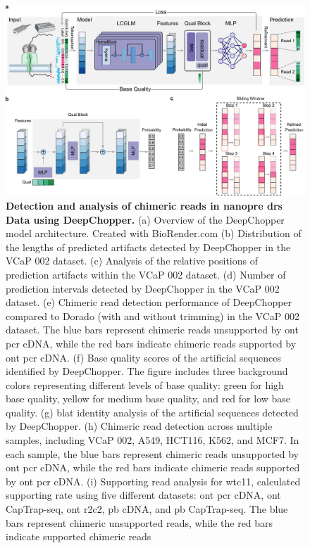 \documentclass[pdflatex, sn-mathphys-num, lineno]{sn-jnl}%
\theoremstyle{thmstyleone}%
\theoremstyle{thmstyletwo}%
\theoremstyle{thmstylethree}%
\begin{document}
\begin{figure}[!h]
	\includegraphics[height=0.78\columnwidth]{figures/finals/figure1}
    \caption{{\bf  Detection and analysis of chimeric reads in nanopre \gls{drs} Data using DeepChopper.} (a) Overview of the DeepChopper model architecture. Created with BioRender.com (b) Distribution of the lengths of predicted artifacts detected by DeepChopper in the VCaP 002 dataset. (c) Analysis of the relative positions of prediction artifacts within the VCaP 002 dataset.  (d) Number of prediction intervals detected by DeepChopper in the VCaP 002 dataset. (e) Chimeric read detection performance of DeepChopper compared to Dorado (with and without trimming) in the VCaP 002 dataset. The blue bars represent chimeric reads unsupported by \gls{ont} \gls{pcr} cDNA, while the red bars indicate chimeric reads supported by \gls{ont} \gls{pcr} cDNA.  (f) Base quality scores of the artificial sequences identified by DeepChopper. The figure includes three background colors representing different levels of base quality: green for high base quality, yellow for medium base quality, and red for low base quality. (g) \gls{blat} identity analysis of the artificial sequences detected by DeepChopper. (h) Chimeric read detection across multiple samples, including VCaP 002, A549, HCT116, K562, and MCF7. In each sample, the blue bars represent chimeric reads unsupported by \gls{ont} \gls{pcr} cDNA, while the red bars indicate chimeric reads supported by \gls{ont} \gls{pcr} cDNA. (i)  Supporting read analysis for wtc11, calculated supporting rate using five different datasets: \gls{ont} \gls{pcr} cDNA, \gls{ont} CapTrap-seq, \gls{ont} \gls{r2c2}, \gls{pb} cDNA, and \gls{pb} CapTrap-seq. The blue bars represent chimeric unsupported reads, while the red bars indicate supported chimeric reads}\label{fig:f1}
\end{figure}
\end{document}
